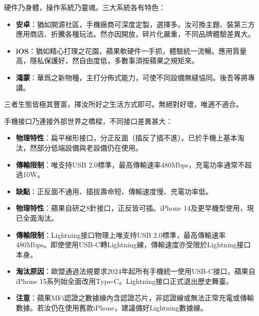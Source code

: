 
硬件乃身體，操作系統乃靈魂。三大系統各有特色：

\begin{itemize}
  \item \textbf{安卓}：猶如開源社區，手機廠商可深度定製，選擇多。汝可換主題、裝第三方應用商店、折騰各種玩法。然亦因開放，碎片化嚴重，不同品牌體驗差異大。
  \item \textbf{iOS}：猶如精心打理之花園，蘋果軟硬件一手抓，體驗統一流暢。應用質量高，隱私保護好，然自由度低，多數事須按蘋果之規矩來。
  \item \textbf{鴻蒙}：華爲之新物種，主打分佈式能力，可使不同設備無縫協同。後吾等將專講。
\end{itemize}

三者生態皆極其豐富，擇汝所好之生活方式即可。無絕對好壞，唯適不適合。


手機接口乃連接外部世界之橋樑，不同接口差異甚大：


\begin{itemize}
  \item \textbf{物理特性}：扁平梯形接口，分正反面（插反了插不進）。已於手機上基本淘汰，然部分低端設備與老設備仍在使用。
  \item \textbf{傳輸限制}：唯支持USB 2.0標準，最高傳輸速率480Mbps，充電功率通常不超過10W。
  \item \textbf{缺點}：正反面不通用、插拔壽命短、傳輸速度慢、充電功率低。
\end{itemize}


\begin{itemize}
  \item \textbf{物理特性}：蘋果自研之8針接口，正反皆可插。iPhone 14及更早機型使用，現已全面淘汰。
  \item \textbf{傳輸限制}：Lightning接口物理上唯支持USB 2.0標準，最高傳輸速率480Mbps。即使使用USB-C轉Lightning線，傳輸速度亦受限於Lightning接口本身。
  \item \textbf{淘汰原因}：歐盟通過法規要求2024年起所有手機統一使用USB-C接口，蘋果自iPhone 15系列始全面改用Type-C。Lightning接口正式退出歷史舞臺。
  \item \textbf{注意}：蘋果MFi認證之數據線內含認證芯片，非認證線或無法正常充電或傳輸數據。若汝仍在使用舊款iPhone，建議備好Lightning數據線。
\end{itemize}

